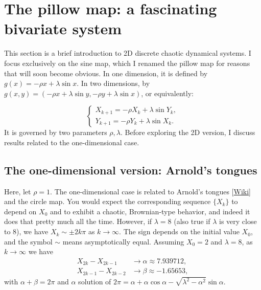 \documentclass[oneside,10pt]{book}
\begin{document}
\section{The pillow map: a fascinating bivariate system}

This section is a brief introduction to 2D discrete chaotic dynamical systems. I focus exclusively on the
\textcolor{index}{sine map}, which I renamed the pillow map for reasons that will soon become obvious.
 In one dimension, it is defined by $g(x)=-\rho x + \lambda \sin x$. In two dimensions, by
 $g(x,y)=(-\rho x + \lambda \sin y, -\rho y + \lambda \sin x)$, or equivalently:

\begin{equation}
    \begin{cases}
      X_{k+1} = -\rho X_k + \lambda \sin Y_k, \\[3pt]
     Y_{k+1} = -\rho Y_k + \lambda \sin X_k. \label{gfda}
    \end{cases} %
\end{equation}
It is governed by two parameters $\rho,\lambda$. Before exploring the 2D version, I discuss results related to the one-dimensional case.

\subsection{The one-dimensional version: Arnold's tongues}

Here, let $\rho=1$. The one-dimensional case is related to
\textcolor{index}{Arnold's tongues} [\href{https://en.wikipedia.org/wiki/Arnold_tongue}{Wiki}] and the \textcolor{index}{circle map}.
You would expect the corresponding sequence $\{X_k\}$ to depend on $X_0$
 and to exhibit a chaotic, Brownian-type behavior, and indeed it does that pretty much all the time.
However, if $\lambda=8$ (also true if $\lambda$  is very close to 8), we have $X_k \sim \pm 2k\pi$ as $k\rightarrow\infty$.
The sign depends on the initial value $X_0$, and the symbol $\sim$ means asymptotically equal.
Assuming $X_0=2$ and $\lambda=8$, as $k\rightarrow\infty$ we have
\begin{align}
X_{2k}-X_{2k-1} & \rightarrow \alpha\approx 7.939712, \nonumber \\
X_{2k-1}-X_{2k-2} & \rightarrow \beta\approx -1.65653, \nonumber
\end{align}
with $\alpha + \beta =2\pi$ and $\alpha$ solution of
$2\pi = \alpha + \alpha\cos\alpha -\sqrt{\lambda^2-\alpha^2}\sin\alpha.$
\end{document}
